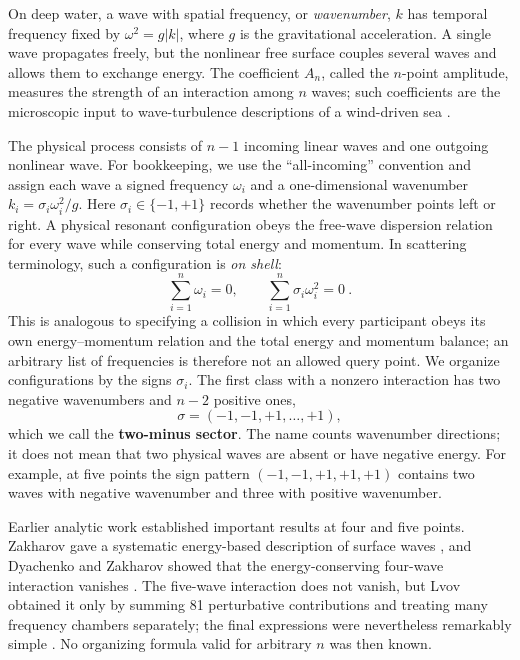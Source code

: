 \documentclass{article}
\begin{document}
On deep water, a wave with spatial frequency, or \emph{wavenumber}, $k$ has
temporal frequency fixed by
$\omega^2=g|k|$, where $g$ is the gravitational acceleration. A single wave
propagates freely, but the nonlinear free surface couples several waves and
allows them to exchange energy. The coefficient $A_n$, called the $n$-point
amplitude, measures the strength of an interaction among $n$ waves; such coefficients are the microscopic input to
wave-turbulence descriptions of a wind-driven sea \citep{Newell2011WaveTurbulence}.

The physical process consists of $n-1$ incoming linear waves and one outgoing
nonlinear wave. For bookkeeping, we use the ``all-incoming'' convention and
assign each wave a signed frequency $\omega_i$ and a one-dimensional wavenumber
$k_i=\sigma_i\omega_i^2/g$. Here $\sigma_i\in\{-1,+1\}$ records whether the
wavenumber points left or right. A physical resonant configuration obeys the
free-wave dispersion relation for every wave while conserving total energy and
momentum. In scattering terminology, such a configuration is \emph{on shell}:
\begin{equation}
\label{eq:energy_momentum_conserve}
\sum_{i=1}^n\omega_i=0,\qquad
\sum_{i=1}^n\sigma_i\omega_i^2=0 ~.
\end{equation}
This is analogous to specifying a collision in which every participant obeys
its own energy--momentum relation and the total energy and momentum balance;
an arbitrary list of frequencies is therefore not an allowed query point.
We organize configurations by the signs $\sigma_i$. The first class with a
nonzero interaction has two negative wavenumbers and $n-2$ positive ones,
\begin{equation}
\sigma=(-1,-1,+1,\ldots,+1),
\end{equation}
which we call the \textbf{two-minus sector}. The name counts wavenumber
directions; it does not mean that two physical waves are absent or have
negative energy.
For example, at five points the sign pattern
$(-1,-1,+1,+1,+1)$ contains two waves with negative wavenumber and three
with positive wavenumber.

Earlier analytic work established important results at four and five points.
Zakharov gave a systematic energy-based description of surface waves
\citep{Zakharov1968}, and
Dyachenko and Zakharov showed that the energy-conserving four-wave interaction vanishes
\citep{DyachenkoZakharov1994}. The five-wave interaction does not vanish, but
Lvov obtained it only by summing 81 perturbative contributions and treating
many frequency chambers separately; the final expressions were nevertheless
remarkably simple \citep{DyachenkoLvovZakharov1995,Lvov1997}. No organizing
formula valid for arbitrary $n$ was then known.
\end{document}
